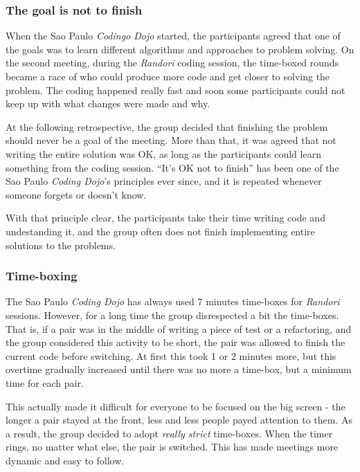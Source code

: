 \subsubsection{The goal is not to finish}

When the Sao Paulo \emph{Codingo Dojo} started, the participants
agreed that one of the goals was to learn different algorithms and
approaches to problem solving. On the second meeting, during the
\textsl{Randori} coding session, the time-boxed rounds became a race
of who could produce more code and get closer to solving the
problem. The coding happened really fast and soon some participants
could not keep up with what changes were made and why.

At the following retrospective, the group decided that finishing the
problem should never be a goal of the meeting. More than that, it was
agreed that not writing the entire solution was OK, as long as the
participants could learn something from the coding session. ``It's OK
not to finish'' has been one of the Sao Paulo \emph{Coding Dojo}'s
principles ever since, and it is repeated whenever someone forgets or
doesn't know.

With that principle clear, the participants take their time writing
code and undestanding it, and the group often does not finish
implementing entire solutions to the problems.

\subsubsection{Time-boxing}

The Sao Paulo \emph{Coding Dojo} has always used 7 minutes time-boxes
for \textsl{Randori} sessions. However, for a long time the group
disrespected a bit the time-boxes. That is, if a pair was in the
middle of writing a piece of test or a refactoring, and the group
considered this activity to be short, the pair was allowed to finish
the current code before switching. At first this took 1 or 2 minutes
more, but this overtime gradually increased until there was no more a
time-box, but a minimum time for each pair.

This actually made it difficult for everyone to be focused on the big
screen - the longer a pair stayed at the front, less and less people
payed attention to them. As a result, the group decided to adopt
\textsl{really strict} time-boxes. When the timer rings, no matter
what else, the pair is switched. This has made meetings more dynamic
and easy to follow.

